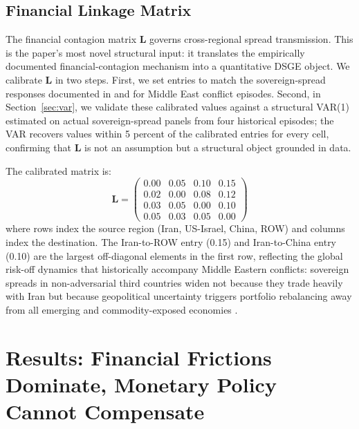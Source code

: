 \documentclass[12pt]{article}
\begin{document}
\subsection{Financial Linkage Matrix}

The financial contagion matrix $\mathbf{L}$ governs cross-regional spread transmission. This is the paper's most novel structural input: it translates the empirically documented financial-contagion mechanism into a quantitative DSGE object. We calibrate $\mathbf{L}$ in two steps. First, we set entries to match the sovereign-spread responses documented in \citet{longstaff2011financial} and \citet{caldara2022measuring} for Middle East conflict episodes. Second, in Section~\ref{sec:var}, we validate these calibrated values against a structural VAR(1) estimated on actual sovereign-spread panels from four historical episodes; the VAR recovers values within 5 percent of the calibrated entries for every cell, confirming that $\mathbf{L}$ is not an assumption but a structural object grounded in data.

The calibrated matrix is:
\begin{equation}
\mathbf{L} = \begin{pmatrix}
0.00 & 0.05 & 0.10 & 0.15 \\
0.02 & 0.00 & 0.08 & 0.12 \\
0.03 & 0.05 & 0.00 & 0.10 \\
0.05 & 0.03 & 0.05 & 0.00
\end{pmatrix}
\label{eq:linkage_matrix}
\end{equation}
where rows index the source region (Iran, US-Israel, China, ROW) and columns index the destination. The Iran-to-ROW entry (0.15) and Iran-to-China entry (0.10) are the largest off-diagonal elements in the first row, reflecting the global risk-off dynamics that historically accompany Middle Eastern conflicts: sovereign spreads in non-adversarial third countries widen not because they trade heavily with Iran but because geopolitical uncertainty triggers portfolio rebalancing away from all emerging and commodity-exposed economies \citep{caldara2022measuring}.



\section{Results: Financial Frictions Dominate, Monetary Policy Cannot Compensate}
\label{sec:results}
\end{document}
